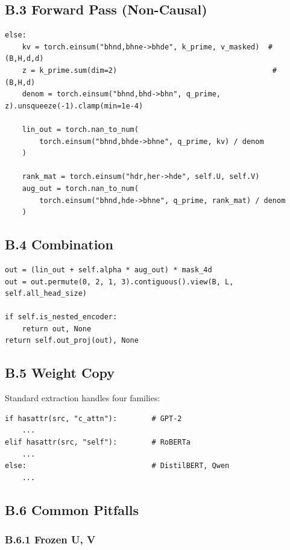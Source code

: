 \subsection{B.3 Forward Pass (Non-Causal)}

\begin{lstlisting}
else:
    kv = torch.einsum("bhnd,bhne->bhde", k_prime, v_masked)  # (B,H,d,d)
    z = k_prime.sum(dim=2)                                    # (B,H,d)
    denom = torch.einsum("bhnd,bhd->bhn", q_prime, z).unsqueeze(-1).clamp(min=1e-4)
    
    lin_out = torch.nan_to_num(
        torch.einsum("bhnd,bhde->bhne", q_prime, kv) / denom
    )
    
    rank_mat = torch.einsum("hdr,her->hde", self.U, self.V)
    aug_out = torch.nan_to_num(
        torch.einsum("bhnd,hde->bhne", q_prime, rank_mat) / denom
    )
\end{lstlisting}

\subsection{B.4 Combination}

\begin{lstlisting}
out = (lin_out + self.alpha * aug_out) * mask_4d
out = out.permute(0, 2, 1, 3).contiguous().view(B, L, self.all_head_size)

if self.is_nested_encoder:
    return out, None
return self.out_proj(out), None
\end{lstlisting}

\subsection{B.5 Weight Copy}

Standard extraction handles four families:

\begin{lstlisting}
if hasattr(src, "c_attn"):        # GPT-2
    ...
elif hasattr(src, "self"):        # RoBERTa
    ...
else:                             # DistilBERT, Qwen
    ...
\end{lstlisting}

\subsection{B.6 Common Pitfalls}

\subsubsection{B.6.1 Frozen U, V}


